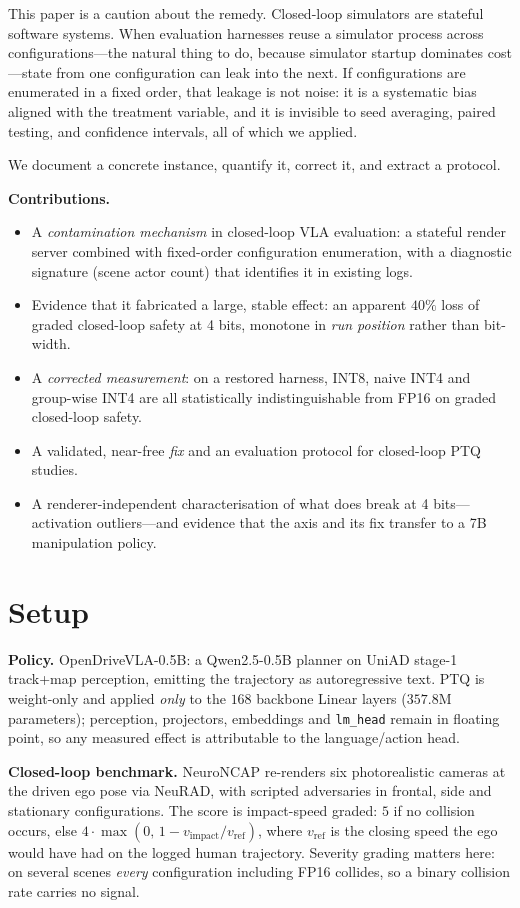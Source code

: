 \documentclass[conference]{IEEEtran}
\begin{document}
This paper is a caution about the remedy. Closed-loop simulators are stateful software systems.
When evaluation harnesses reuse a simulator process across configurations---the natural thing to
do, because simulator startup dominates cost---state from one configuration can leak into the
next. If configurations are enumerated in a fixed order, that leakage is not noise: it is a
systematic bias aligned with the treatment variable, and it is invisible to seed averaging,
paired testing, and confidence intervals, all of which we applied.

We document a concrete instance, quantify it, correct it, and extract a protocol.

\textbf{Contributions.}
\begin{itemize}
\item A \emph{contamination mechanism} in closed-loop VLA evaluation: a stateful render server
combined with fixed-order configuration enumeration, with a diagnostic signature (scene actor
count) that identifies it in existing logs.
\item Evidence that it fabricated a large, stable effect: an apparent $40\%$ loss of graded
closed-loop safety at 4 bits, monotone in \emph{run position} rather than bit-width.
\item A \emph{corrected measurement}: on a restored harness, INT8, naive INT4 and group-wise INT4
are all statistically indistinguishable from FP16 on graded closed-loop safety.
\item A validated, near-free \emph{fix} and an evaluation protocol for closed-loop PTQ studies.
\item A renderer-independent characterisation of what does break at 4 bits---activation
outliers---and evidence that the axis and its fix transfer to a 7B manipulation policy.
\end{itemize}

\section{Setup}
\textbf{Policy.} OpenDriveVLA-0.5B: a Qwen2.5-0.5B planner on UniAD stage-1 track+map perception,
emitting the trajectory as autoregressive text. PTQ is weight-only and applied \emph{only} to the
$168$ backbone Linear layers ($357.8$M parameters); perception, projectors, embeddings and
\texttt{lm\_head} remain in floating point, so any measured effect is attributable to the
language/action head.

\textbf{Closed-loop benchmark.} NeuroNCAP re-renders six photorealistic cameras at the driven ego
pose via NeuRAD, with scripted adversaries in frontal, side and stationary configurations. The
score is impact-speed graded: $5$ if no collision occurs, else
$4\cdot\max(0,\,1-v_\text{impact}/v_\text{ref})$, where $v_\text{ref}$ is the closing speed the ego
would have had on the logged human trajectory. Severity grading matters here: on several scenes
\emph{every} configuration including FP16 collides, so a binary collision rate carries no signal.
\end{document}
